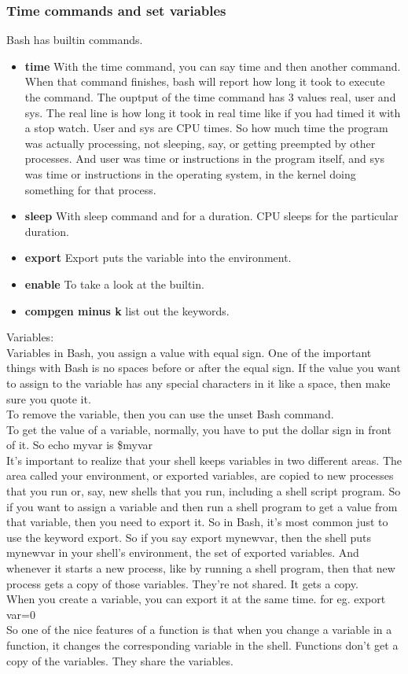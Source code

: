 \subsubsection{Time commands and set variables}
Bash has builtin commands. 
\begin{itemize}
    \item \textbf{time} With the time command, you can say time and then another command. When that command finishes, bash will report how long it took to execute the command. The ouptput of the time command has 3 values real, user and sys. The real line is how long it took in real time like if you had timed it with a stop watch. User and sys are CPU times. So how much time the program was actually processing, not sleeping, say, or getting preempted by other processes. And user was time or instructions in the program itself, and sys was time or instructions in the operating system, in the kernel doing something for that process. 
    \item \textbf{sleep} With sleep command and for a duration. CPU sleeps for the particular duration. 
    \item \textbf{export} Export puts the variable into the environment.
    \item \textbf{enable} To take a look at the builtin.
    \item \textbf{compgen minus k} list out the keywords.
\end{itemize}

Variables:\\ Variables in Bash, you assign a value with equal sign. One of the important things with Bash is no spaces before or after the equal sign. If the value you want to assign to the variable has any special characters in it like a space, then make sure you quote it.\\
To remove the variable, then you can use the unset Bash command.\\ 
To get the value of a variable, normally, you have to put the dollar sign in front of it. So echo myvar is \$myvar \\
It's important to realize that your shell keeps variables in two different areas. The area called your environment, or exported variables, are copied to new processes that you run or, say, new shells that you run, including a shell script program. So if you want to assign a variable and then run a shell program to get a value from that variable, then you need to export it. So in Bash, it's most common just to use the keyword export. So if you say export mynewvar, then the shell puts mynewvar in your shell's environment, the set of exported variables. And whenever it starts a new process, like by running a shell program, then that new process gets a copy of those variables. They're not shared. It gets a copy.\\
When you create a variable, you can export it at the same time. for eg. export var=0\\
So one of the nice features of a function is that when you change a variable in a function, it changes the corresponding variable in the shell. Functions don't get a copy of the variables. They share the variables. 

